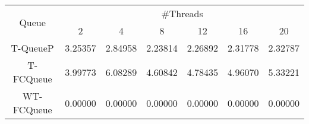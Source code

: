 \begin{tabular}{|c|c|c|c|c|c|c|}
\hline
\multirow{2}{*}{Queue} & \multicolumn{6}{c|}{\#Threads}\\\cline{2-7}& 2 & 4 & 8 & 12 & 16 & 20\\
\hline
\hline
T-QueueP & 3.25357 & 2.84958 & 2.23814 & 2.26892 & 2.31778 & 2.32787\\
T-FCQueue & 3.99773 & 6.08289 & 4.60842 & 4.78435 & 4.96070 & 5.33221\\
WT-FCQueue & 0.00000 & 0.00000 & 0.00000 & 0.00000 & 0.00000 & 0.00000\\
\hline\end{tabular}
